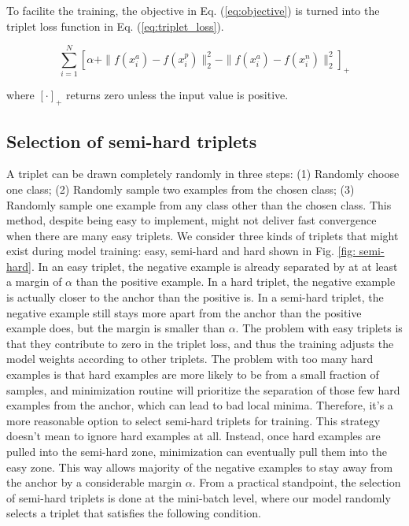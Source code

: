 To facilite the training, the objective in Eq. (\ref{eq:objective}) is turned into the
triplet loss function in Eq. (\ref{eq:triplet_loss}).

\begin{equation} \label{eq:triplet_loss}
    \sum_{i=1}^{N} \left[ \alpha + \|f(x_i^a) - f(x_i^p)\|_2^2 - \|f(x_i^a) -
    f(x_i^n)\|_2^2 \right]_+
\end{equation}

where $[\cdot]_+$ returns zero unless the input value is positive.  


\subsection{Selection of semi-hard triplets}

A triplet can be drawn completely randomly in three steps: (1) Randomly choose
one class;  (2) Randomly sample two examples from the chosen class;  (3)
Randomly sample one example from any class other than the chosen class.  This
method, despite being easy to implement, might not deliver fast convergence when
there are many easy triplets.  We consider three kinds of triplets that might
exist during model training: easy, semi-hard and hard shown in Fig. \ref{fig:
semi-hard}.  In an easy triplet, the negative example is already separated by at
at least a margin of $\alpha$ than the positive example.  In a hard triplet, the
negative example is actually closer to the anchor than the positive is.  In a
semi-hard triplet, the negative example still stays more apart from the anchor
than the positive example does, but the margin is smaller than $\alpha$.  The
problem with easy triplets is that they contribute to zero in the triplet loss,
and thus the training adjusts the model weights according to other triplets. The
problem with too many hard examples is that hard examples are more likely to be
from a small fraction of samples, and minimization routine will prioritize the
separation of those few hard examples from the anchor, which can lead to bad
local minima.  Therefore, it's a more reasonable option to select semi-hard
triplets for training.  This strategy doesn't mean to ignore hard examples at
all.  Instead, once hard examples are pulled into the semi-hard zone,
minimization can eventually pull them into the easy zone. This way allows
majority of the negative examples to stay away from the anchor by a considerable
margin $\alpha$.  From a practical standpoint, the selection of semi-hard
triplets is done at the mini-batch level, where our model randomly selects a
triplet that satisfies the following condition.  

